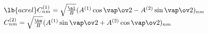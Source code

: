 \begin{equation}
\begin{array}{l}
\lb{acrel}
C_{nm}^{(1)} = \sqrt{\al \over B} ( A^{(1)}\cos{\vap\ov 2} 
- A^{(2)} \sin{\vap\ov 2})_{nm}\\
C_{nm}^{(2)} = \sqrt{\be \over B} ( A^{(1)} \sin{\vap\ov 2} 
+ A^{(2)} \cos{\vap\ov 2})_{nm}
\end{array}
\end{equation}

